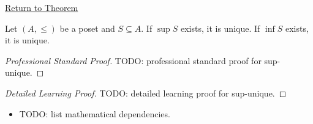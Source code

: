 \newpage
{}
\label{prf:sup-unique}

\begin{remark*}[Return]
\hyperref[prop:sup-unique]{Return to Theorem}
\end{remark*}

\begin{proposition*}
Let $(A, \leq)$ be a poset and $S \subseteq A$.  If $\sup S$ exists, it is
unique.  If $\inf S$ exists, it is unique.
\end{proposition*}

\begin{proof}[Professional Standard Proof]
\LRAProofBodyStart
TODO: professional standard proof for sup-unique.
\end{proof}

\begin{proof}[Detailed Learning Proof]
\LRAProofBodyStart
TODO: detailed learning proof for sup-unique.
\end{proof}

\begin{remark*}
\end{remark*}

\begin{dependencies}
\begin{itemize}
  \item TODO: list mathematical dependencies.
\end{itemize}
\end{dependencies}

\clearpage
